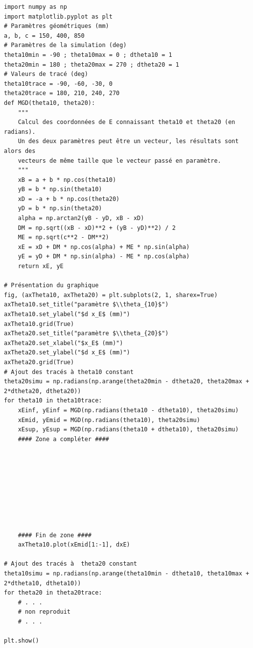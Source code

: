 \documentclass[10pt,fleqn]{article} %
\begin{document}
\begin{lstlisting}
import numpy as np
import matplotlib.pyplot as plt
# Paramètres géométriques (mm)
a, b, c = 150, 400, 850
# Paramètres de la simulation (deg)
theta10min = -90 ; theta10max = 0 ; dtheta10 = 1
theta20min = 180 ; theta20max = 270 ; dtheta20 = 1
# Valeurs de tracé (deg)
theta10trace = -90, -60, -30, 0
theta20trace = 180, 210, 240, 270
def MGD(theta10, theta20):
    """
    Calcul des coordonnées de E connaissant theta10 et theta20 (en radians).
    Un des deux paramètres peut être un vecteur, les résultats sont alors des
    vecteurs de même taille que le vecteur passé en paramètre.
    """
    xB = a + b * np.cos(theta10)
    yB = b * np.sin(theta10)
    xD = -a + b * np.cos(theta20)
    yD = b * np.sin(theta20)
    alpha = np.arctan2(yB - yD, xB - xD)
    DM = np.sqrt((xB - xD)**2 + (yB - yD)**2) / 2
    ME = np.sqrt(c**2 - DM**2)
    xE = xD + DM * np.cos(alpha) + ME * np.sin(alpha)
    yE = yD + DM * np.sin(alpha) - ME * np.cos(alpha)
    return xE, yE

# Présentation du graphique
fig, (axTheta10, axTheta20) = plt.subplots(2, 1, sharex=True)
axTheta10.set_title("paramètre $\\theta_{10}$")
axTheta10.set_ylabel("$d x_E$ (mm)")
axTheta10.grid(True)
axTheta20.set_title("paramètre $\\theta_{20}$")
axTheta20.set_xlabel("$x_E$ (mm)")
axTheta20.set_ylabel("$d x_E$ (mm)")
axTheta20.grid(True)
# Ajout des tracés à theta10 constant
theta20simu = np.radians(np.arange(theta20min - dtheta20, theta20max + 2*dtheta20, dtheta20))
for theta10 in theta10trace:
    xEinf, yEinf = MGD(np.radians(theta10 - dtheta10), theta20simu)
    xEmid, yEmid = MGD(np.radians(theta10), theta20simu)
    xEsup, yEsup = MGD(np.radians(theta10 + dtheta10), theta20simu)
    #### Zone a compléter ####
    
   
    
    
    
    
    

    
    #### Fin de zone ####
    axTheta10.plot(xEmid[1:-1], dxE)
    
# Ajout des tracés à  theta20 constant
theta10simu = np.radians(np.arange(theta10min - dtheta10, theta10max + 2*dtheta10, dtheta10))
for theta20 in theta20trace:
    # . . .
    # non reproduit
    # . . .
    
plt.show()
\end{lstlisting}
\fi
\end{document}
